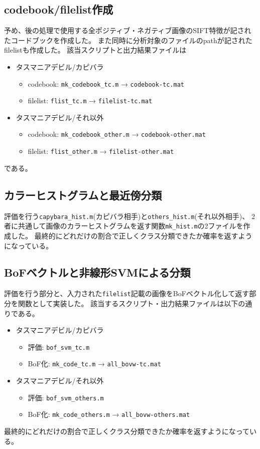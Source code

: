 \documentclass[11pt,a4paper, uplatex]{jsreport}
\begin{document}
\subsection{codebook/filelist作成}
予め、後の処理で使用する全ポジティブ・ネガティブ画像のSIFT特徴が記されたコードブックを作成した。
また同時に分析対象のファイルのpathが記されたfilelistも作成した。
該当スクリプトと出力結果ファイルは
\begin{itemize}
  \item タスマニアデビル/カピバラ
  \begin{itemize}
    \item codebook: \texttt{mk_codebook_tc.m} → \texttt{codebook-tc.mat}
    \item filelist: \texttt{flist_tc.m} → \texttt{filelist-tc.mat}
  \end{itemize}
  \item タスマニアデビル/それ以外
  \begin{itemize}
    \item codebook: \texttt{mk_codebook_other.m} → \texttt{codebook-other.mat}
    \item filelist: \texttt{flist_other.m} → \texttt{filelist-other.mat}
  \end{itemize}
\end{itemize}
である。
\subsection{カラーヒストグラムと最近傍分類}
評価を行う\texttt{capybara_hist.m}(カピバラ相手)と\texttt{others_hist.m}(それ以外相手)、
2者に共通して画像のカラーヒストグラムを返す関数\texttt{mk_hist.m}の2ファイルを作成した。
最終的にどれだけの割合で正しくクラス分類できたか確率を返すようになっている。
\subsection{BoFベクトルと非線形SVMによる分類}
評価を行う部分と、入力された\texttt{filelist}記載の画像をBoFベクトル化して返す部分を関数として実装した。
該当するスクリプト・出力結果ファイルは以下の通りである。
\begin{itemize}
  \item タスマニアデビル/カピバラ
  \begin{itemize}
    \item 評価: \texttt{bof_svm_tc.m}
    \item BoF化: \texttt{mk_code_tc.m} → \texttt{all_bovw-tc.mat}
  \end{itemize}
  \item タスマニアデビル/それ以外
  \begin{itemize}
    \item 評価: \texttt{bof_svm_others.m}
    \item BoF化: \texttt{mk_code_others.m} → \texttt{all_bovw-others.mat}
  \end{itemize}
\end{itemize}
最終的にどれだけの割合で正しくクラス分類できたか確率を返すようになっている。
\end{document}
